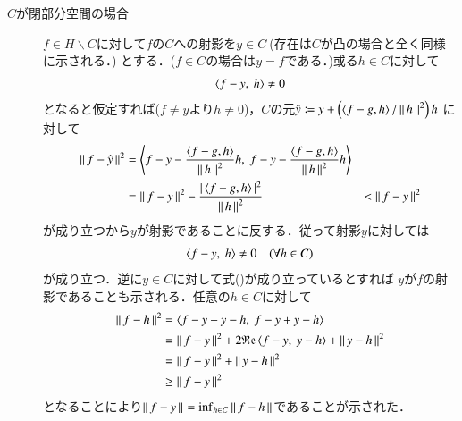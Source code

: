 \begin{qst}
\begin{prf}
\begin{description}
	\item[$C$が閉部分空間の場合]
		$f \in H \backslash C$に対して$f$の$C$への射影を$y \in C\ $(存在は$C$が凸の場合と全く同様に示される．)
		とする．($f \in C$の場合は$y = f$である．)或る$h \in C$に対して
		\begin{align}
			\inprod<f -y,\ h> \neq 0
		\end{align}
		となると仮定すれば($f \neq y$より$h \neq 0$)，$C$の元$\hat{y} \coloneqq y + \left(\inprod<f - g,h>/\Norm{h}{}^2\right)h$
		に対して
		\begin{align}
			\Norm{f - \hat{y}}{}^2 
			&= \inprod<f - y - \frac{\inprod<f - g,h>}{\Norm{h}{}^2}h,\ f - y - \frac{\inprod<f - g,h>}{\Norm{h}{}^2}h> \\
			&= \Norm{f-y}{}^2 - \frac{|\inprod<f - g,h>|^2}{\Norm{h}{}^2}
			&< \Norm{f-y}{}^2
		\end{align}
		が成り立つから$y$が射影であることに反する．従って射影$y$に対しては
		\begin{align}
			\inprod<f -y,\ h> \neq 0 \quad (\forall h \in C) \label{eq:projection}
		\end{align}
		が成り立つ．逆に$y \in C$に対して式()が成り立っているとすれば
		$y$が$f$の射影であることも示される．任意の$h \in C$に対して
		\begin{align}
			\Norm{f - h}{}^2 &= \inprod<f - y + y - h,\ f - y + y - h> \\
			&= \Norm{f - y}{}^2 + 2 \Re{\inprod<f - y,\ y - h>} + \Norm{y - h}{}^2 \\
			&= \Norm{f - y}{}^2 + \Norm{y - h}{}^2 \\
			&\geq \Norm{f - y}{}^2
		\end{align}
		となることにより$\left\|\, f - y\, \right\|_{} = \operatorname*{inf}_{h \in C} \left\|\, f - h\, \right\|_{}$であることが示された．
	\end{description}
\end{prf}
\end{qst}